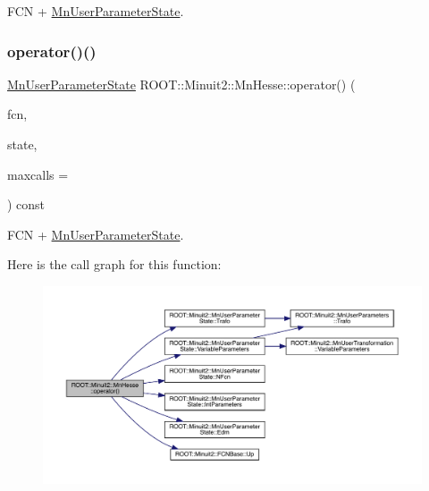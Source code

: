 F\+CN + \mbox{\hyperlink{classROOT_1_1Minuit2_1_1MnUserParameterState}{Mn\+User\+Parameter\+State}}. 

\mbox{\label{classROOT_1_1Minuit2_1_1MnHesse_a4ebea568262a19a0cfec1473ce7a5f0f}} 
\subsubsection{\texorpdfstring{operator()()}{operator()()}\hspace{0.1cm}{\footnotesize\ttfamily [12/16]}}
{\footnotesize\ttfamily \mbox{\hyperlink{classROOT_1_1Minuit2_1_1MnUserParameterState}{Mn\+User\+Parameter\+State}} R\+O\+O\+T\+::\+Minuit2\+::\+Mn\+Hesse\+::operator() (\begin{DoxyParamCaption}\item[{const \mbox{\hyperlink{classROOT_1_1Minuit2_1_1FCNBase}{F\+C\+N\+Base}} \&}]{fcn,  }\item[{const \mbox{\hyperlink{classROOT_1_1Minuit2_1_1MnUserParameterState}{Mn\+User\+Parameter\+State}} \&}]{state,  }\item[{unsigned int}]{maxcalls = {} }\end{DoxyParamCaption}) const}



F\+CN + \mbox{\hyperlink{classROOT_1_1Minuit2_1_1MnUserParameterState}{Mn\+User\+Parameter\+State}}. 

Here is the call graph for this function\+:\nopagebreak
\begin{figure}[H]
\begin{center}
\leavevmode
\includegraphics[width=350pt]{d1/d02/classROOT_1_1Minuit2_1_1MnHesse_a4ebea568262a19a0cfec1473ce7a5f0f_cgraph}
\end{center}
\end{figure}
\mbox{\label{classROOT_1_1Minuit2_1_1MnHesse_a3b6ba68a41260029bc6bde433170e600}} 
